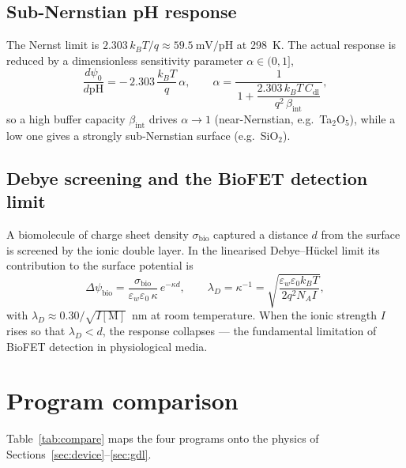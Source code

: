 \documentclass[11pt,a4paper]{article}
\begin{document}
\subsection{Sub-Nernstian pH response}
The Nernst limit is $2.303\,k_BT/q \approx 59.5~\mathrm{mV/pH}$ at 298~K. The
actual response is reduced by a dimensionless sensitivity parameter
$\alpha\in(0,1]$,
\begin{equation}
  \frac{d\psi_0}{d\mathrm{pH}} = -\,2.303\,\frac{k_BT}{q}\,\alpha,
  \qquad
  \alpha = \frac{1}{\,1 + \dfrac{2.303\,k_BT\,C_{\mathrm{dl}}}{q^2\,\beta_{\mathrm{int}}}\,},
  \label{eq:alpha}
\end{equation}
so a high buffer capacity $\beta_{\mathrm{int}}$ drives $\alpha\to1$ (near-Nernstian,
e.g.\ Ta$_2$O$_5$), while a low one gives a strongly sub-Nernstian surface (e.g.\
SiO$_2$).

\subsection{Debye screening and the BioFET detection limit}
A biomolecule of charge sheet density $\sigma_{\mathrm{bio}}$ captured a distance
$d$ from the surface is screened by the ionic double layer. In the linearised
Debye--H\"uckel limit its contribution to the surface potential is
\begin{equation}
  \Delta\psi_{\mathrm{bio}} =
  \frac{\sigma_{\mathrm{bio}}}{\varepsilon_w\varepsilon_0\,\kappa}\,
  e^{-\kappa d},
  \qquad
  \lambda_D = \kappa^{-1} =
  \sqrt{\frac{\varepsilon_w\varepsilon_0 k_B T}{2 q^2 N_A I}},
  \label{eq:debye}
\end{equation}
with $\lambda_D\approx 0.30/\sqrt{I[\mathrm{M}]}$~nm at room temperature. When the
ionic strength $I$ rises so that $\lambda_D<d$, the response collapses --- the
fundamental limitation of BioFET detection in physiological media.

\section{Program comparison}
\label{sec:compare}

Table~\ref{tab:compare} maps the four programs onto the physics of
Sections~\ref{sec:device}--\ref{sec:gdl}.
\end{document}
